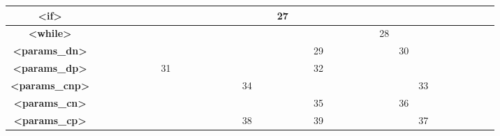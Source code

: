 \documentclass[a4paper,12pt]{article}
\begin{document}
\begin{landscape}
\begin{table}[!ht]
{\begin{tabular}{|c|c|c|c|c|c|c|c|c|c|c|c|c|c|c|c|c|c|c|c|c|c|c|c|c|}
				\textbf{\textless{}if\textgreater{}}          & ~                        & ~              & ~            & ~               & ~          & ~             & ~               & ~             & ~          & ~                                           & ~ & 27 & ~ & ~  & ~ & ~  & ~ & ~  & ~  & ~                                          & ~  & ~  & ~ & ~  \\ \hline
				\textbf{\textless{}while\textgreater{}}       & ~                        & ~              & ~            & ~               & ~          & ~             & ~               & ~             & ~          & ~                                           & ~ & ~  & ~ & ~  & ~ & ~  & ~ & 28 & ~  & ~                                          & ~  & ~  & ~ & ~  \\ \hline
				\textbf{\textless{}params\_dn\textgreater{}}  & ~                        & ~              & ~            & ~               & ~          & ~             & ~               & ~             & ~          & ~                                           & ~ & ~  & ~ & 29 & ~ & ~  & ~ & ~  & 30 & ~                                          & ~  & ~  & ~ & ~  \\ \hline
				\textbf{\textless{}params\_dp\textgreater{}}  & ~                        & ~              & ~            & ~               & 31         & ~             & ~               & ~             & ~          & ~                                           & ~ & ~  & ~ & 32 & ~ & ~  & ~ & ~  & ~  & ~                                          & ~  & ~  & ~ & ~  \\ \hline
				\textbf{\textless{}params\_cnp\textgreater{}} & ~                        & ~              & ~            & ~               & ~          & ~             & ~               & ~             & ~          & 34                                          & ~ & ~  & ~ & ~  & ~ & ~  & ~ & ~  & ~  & 33                                         & ~  & ~  & ~ & ~  \\ \hline
				\textbf{\textless{}params\_cn\textgreater{}}  & ~                        & ~              & ~            & ~               & ~          & ~             & ~               & ~             & ~          & ~                                           & ~ & ~  & ~ & 35 & ~ & ~  & ~ & ~  & 36 & ~                                          & ~  & ~  & ~ & ~  \\ \hline
				\textbf{\textless{}params\_cp\textgreater{}}  & ~                        & ~              & ~            & ~               & ~          & ~             & ~               & ~             & ~          & 38                                          & ~ & ~  & ~ & 39 & ~ & ~  & ~ & ~  & ~  & 37                                         & ~  & ~  & ~ & ~  \\ \hline

\end{tabular}}
\end{table}
\end{landscape}
\end{document}
